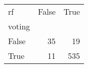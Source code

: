 \begin{tabular}{lrr}
\toprule
rf &  False &  True  \\
voting &        &        \\
\midrule
False  &     35 &     19 \\
True   &     11 &    535 \\
\bottomrule
\end{tabular}
